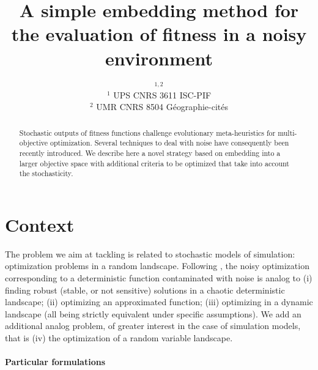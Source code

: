 


\title{A simple embedding method for the evaluation of fitness in a noisy environment}
\author{$^{1,2}$\\
$^1$ UPS CNRS 3611 ISC-PIF\\
$^2$ UMR CNRS 8504 G{\'e}ographie-cit{\'e}s
}
\date{}


\maketitle

\justify


\begin{abstract}
Stochastic outputs of fitness functions challenge evolutionary meta-heuristics for multi-objective optimization. Several techniques to deal with noise have consequently been recently introduced. We describe here a novel strategy based on embedding into a larger objective space with additional criteria to be optimized that take into account the stochasticity.
\end{abstract}


\section{Context}

The problem we aim at tackling is related to stochastic models of simulation: optimization problems in a random landscape. Following \cite{rakshit2017noisy}, the noisy optimization corresponding to a deterministic function contaminated with noise is analog to (i) finding robust (stable, or not sensitive) solutions in a chaotic deterministic landscape; (ii) optimizing an approximated function; (iii) optimizing in a dynamic landscape (all being strictly equivalent under specific assumptions). We add an additional analog problem, of greater interest in the case of simulation models, that is (iv) the optimization of a random variable landscape.

\paragraph{Particular formulations}


